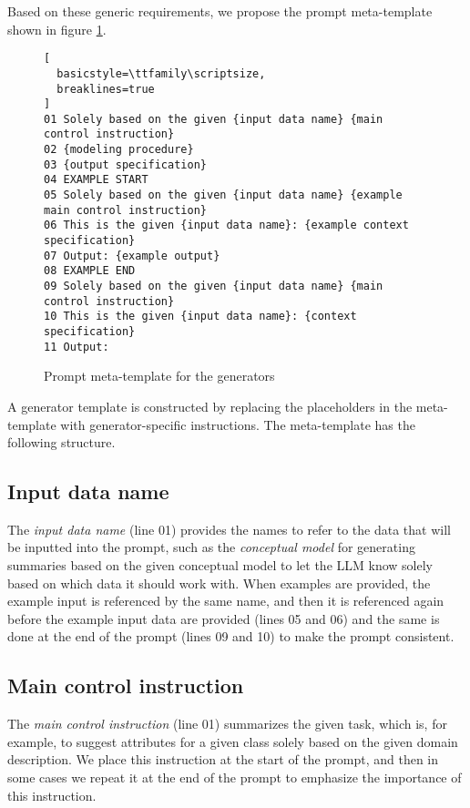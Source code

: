 Based on these generic requirements, we propose the prompt meta-template shown in figure \ref{fig:meta-templates}.

\begin{figure}[!h]
    \centering
\begin{lstlisting}[
  basicstyle=\ttfamily\scriptsize,
  breaklines=true
]
01 Solely based on the given {input data name} {main control instruction}
02 {modeling procedure}
03 {output specification}
04 EXAMPLE START
05 Solely based on the given {input data name} {example main control instruction}
06 This is the given {input data name}: {example context specification}
07 Output: {example output}
08 EXAMPLE END
09 Solely based on the given {input data name} {main control instruction}
10 This is the given {input data name}: {context specification}
11 Output:
\end{lstlisting}
    \caption{\centering Prompt meta-template for the generators}
    \label{fig:meta-templates}
\end{figure}


A generator template is constructed by replacing the placeholders in the meta-template with generator-specific instructions. The meta-template has the following structure.


\subsection{Input data name}

The \emph{input data name} (line 01) provides the names to refer to the data that will be inputted into the prompt, such as the \textit{conceptual model} for generating summaries based on the given conceptual model to let the LLM know solely based on which data it should work with. When examples are provided, the example input is referenced by the same name, and then it is referenced again before the example input data are provided (lines 05 and 06) and the same is done at the end of the prompt (lines 09 and 10) to make the prompt consistent.


\subsection{Main control instruction}

The \emph{main control instruction} (line 01) summarizes the given task, which is, for example, to suggest attributes for a given class solely based on the given domain description. We place this instruction at the start of the prompt, and then in some cases we repeat it at the end of the prompt to emphasize the importance of this instruction.


